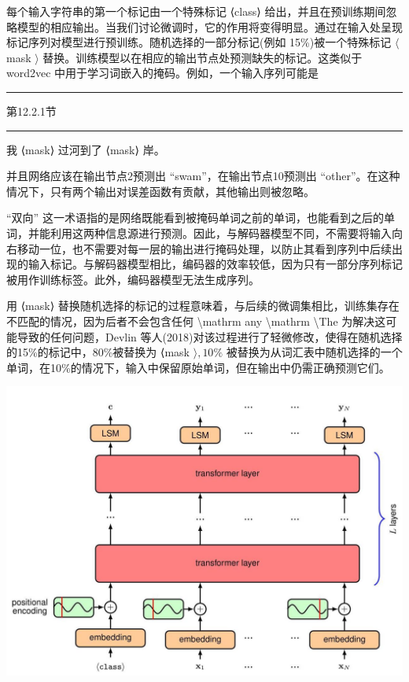 \documentclass[10pt]{article}
\newcommand{\HRule}{\begin{center}\rule{0.9\linewidth}{0.2mm}\end{center}}
\begin{document}
每个输入字符串的第一个标记由一个特殊标记 ⟨class⟩ 给出，并且在预训练期间忽略模型的相应输出。当我们讨论微调时，它的作用将变得明显。通过在输入处呈现标记序列对模型进行预训练。随机选择的一部分标记(例如 15\%)被一个特殊标记 \(\langle\) mask \(\rangle\) 替换。训练模型以在相应的输出节点处预测缺失的标记。这类似于 word2vec 中用于学习词嵌入的掩码。例如，一个输入序列可能是

\HRule

第12.2.1节

\HRule

我 ⟨mask⟩ 过河到了 ⟨mask⟩ 岸。

并且网络应该在输出节点2预测出 “swam”，在输出节点10预测出 “other”。在这种情况下，只有两个输出对误差函数有贡献，其他输出则被忽略。

“双向” 这一术语指的是网络既能看到被掩码单词之前的单词，也能看到之后的单词，并能利用这两种信息源进行预测。因此，与解码器模型不同，不需要将输入向右移动一位，也不需要对每一层的输出进行掩码处理，以防止其看到序列中后续出现的输入标记。与解码器模型相比，编码器的效率较低，因为只有一部分序列标记被用作训练标签。此外，编码器模型无法生成序列。

用 ⟨mask⟩ 替换随机选择的标记的过程意味着，与后续的微调集相比，训练集存在不匹配的情况，因为后者不会包含任何  \textbackslash mathrm any  \textbackslash mathrm \textbackslash The 为解决这可能导致的任何问题，Devlin 等人(2018)对该过程进行了轻微修改，使得在随机选择的15\%的标记中，80\%被替换为 ⟨mask \(\rangle ,{10}\%\) 被替换为从词汇表中随机选择的一个单词，在10\%的情况下，输入中保留原始单词，但在输出中仍需正确预测它们。

\begin{center}
\includegraphics[max width=1.0\textwidth]{images/0194e279-9b28-703a-88f4-c3ac21e2010d_408_285_312_1264_924_0.jpg}
\end{center}
\hspace*{3em} 
\end{document}
